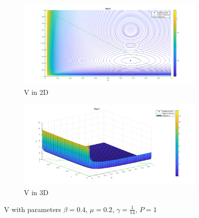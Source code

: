 \begin{figure}[h!]
    \centering
    \label{fig:lyapunov_r0_major_1}
    \begin{subfigure}{\textwidth}
        \centering
        \includegraphics[width=\linewidth]{Figure/lyapunov_2d_R0_major_1.png}  
        \caption{V in 2D}
        \label{fig:lyapunov_r0_major_1_first}
    \end{subfigure}
    \begin{subfigure}{\textwidth}
        \centering
        \includegraphics[width=\linewidth]{Figure/lyapunov_3d_R0_major_1.png}  
        \caption{V in 3D}
        \label{fig:lyapunov_r0_major_1_second}
    \end{subfigure}
    \caption{V with parameters $\beta = 0.4$, $\mu = 0.2$, $\gamma = \frac{1}{14}$, $P = 1$}
\end{figure}


